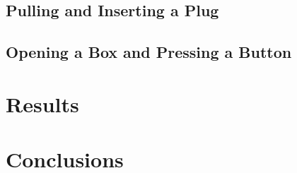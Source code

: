 \documentclass[letterpaper, 10 pt, conference]{ieeeconf}
\begin{document}
		\subsection{Pulling and Inserting a Plug}
		
		\subsection{Opening a Box and Pressing a Button}
		
	\section{Results}
	
	\section{Conclusions}
	
	
	
	
\end{document}
